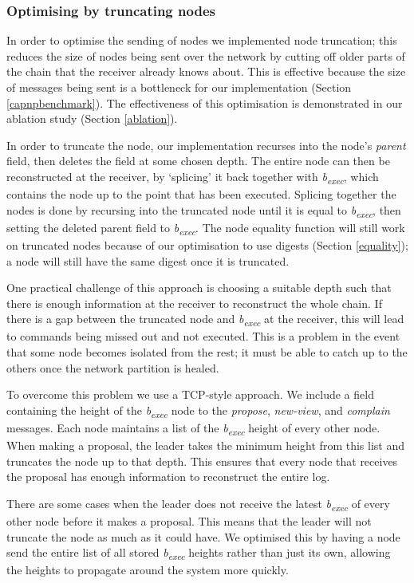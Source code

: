 \subsubsection{Optimising by truncating nodes} \label{truncation}
In order to optimise the sending of nodes we implemented node truncation; this reduces the size of nodes being sent over the network by cutting off older parts of the chain that the receiver already knows about. This is effective because the size of messages being sent is a bottleneck for our implementation (Section \ref{capnpbenchmark}). The effectiveness of this optimisation is demonstrated in our ablation study (Section \ref{ablation}).

In order to truncate the node, our implementation recurses into the node's \textit{parent} field, then deletes the field at some chosen depth. The entire node can then be reconstructed at the receiver, by `splicing' it back together with \textit{b\textsubscript{exec}}, which contains the node up to the point that has been executed. Splicing together the nodes is done by recursing into the truncated node until it is equal to \textit{b\textsubscript{exec}}, then setting the deleted parent field to \textit{b\textsubscript{exec}}. The node equality function will still work on truncated nodes because of our optimisation to use digests (Section \ref{equality}); a node will still have the same digest once it is truncated.

One practical challenge of this approach is choosing a suitable depth such that there is enough information at the receiver to reconstruct the whole chain. If there is a gap between the truncated node and \textit{b\textsubscript{exec}} at the receiver, this will lead to commands being missed out and not executed. This is a problem in the event that some node becomes isolated from the rest; it must be able to catch up to the others once the network partition is healed.

To overcome this problem we use a TCP-style approach. We include a field containing the height of the \textit{b\textsubscript{exec}} node to the \textit{propose}, \textit{new-view}, and \textit{complain} messages. Each node maintains a list of the \textit{b\textsubscript{exec}} height of every other node. When making a proposal, the leader takes the minimum height from this list and truncates the node up to that depth. This ensures that every node that receives the proposal has enough information to reconstruct the entire log.

There are some cases when the leader does not receive the latest \textit{b\textsubscript{exec}} of every other node before it makes a proposal. This means that the leader will not truncate the node as much as it could have. We optimised this by having a node send the entire list of all stored \textit{b\textsubscript{exec}} heights rather than just its own, allowing the heights to propagate around the system more quickly.

